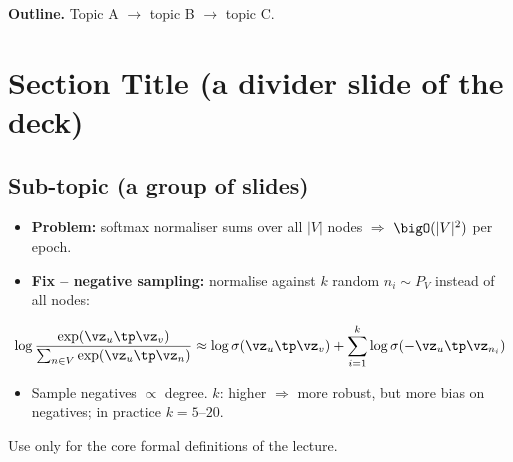 %
\label{ch:lecNN}

\textbf{Outline.} Topic A $\to$ topic B $\to$ topic C.

\section{Section Title (a divider slide of the deck)}\label{sec:lecNN-a}

\subsection{Sub-topic (a group of slides)}

\begin{itemize}
  \item \textbf{Problem:} softmax normaliser sums over all $|V|$ nodes
    $\Rightarrow$ $\bigO(|V|^2)$ per epoch.
  \item \textbf{Fix -- negative sampling:} normalise against $k$ random
     $n_i\sim P_V$ instead of all nodes:
\end{itemize}
\begin{equation}\label{eq:lecNN-negsamp}
  \log\frac{\exp(\vz_u\tp\vz_v)}{\sum_{n\in V}\exp(\vz_u\tp\vz_n)}
  \approx \log\sigma(\vz_u\tp\vz_v)+\sum_{i=1}^{k}\log\sigma(-\vz_u\tp\vz_{n_i})
\end{equation}
\begin{itemize}
  \item Sample negatives $\propto$ degree. $k$: higher $\Rightarrow$ more
    robust, but more bias on negatives; in practice $k=5$--$20$.
\end{itemize}

\begin{definition}[Name]\label{def:lecNN-name}
  Use only for the core formal definitions of the lecture.
\end{definition}

